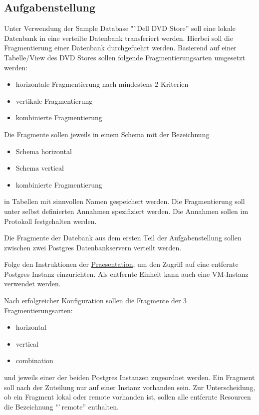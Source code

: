\subsection{Aufgabenstellung}
Unter Verwendung der Sample Database "`Dell DVD Store'' soll eine lokale Datenbank in eine verteilte Datenbank transferiert werden. Hierbei soll die Fragmentierung einer Datenbank durchgefuehrt werden. Basierend auf einer Tabelle/View des DVD Stores sollen folgende Fragmentierungsarten umgesetzt werden:
\begin{itemize}
	\item horizontale Fragmentierung nach mindestens 2 Kriterien
	\item vertikale Fragmentierung
	\item kombinierte Fragmentierung
\end{itemize}
Die Fragmente sollen jeweils in einem Schema mit der Bezeichnung
\begin{itemize}
	\item Schema horizontal
	\item Schema vertical
	\item kombinierte Fragmentierung
\end{itemize}
in Tabellen mit sinnvollen Namen gespeichert werden. Die Fragmentierung soll unter selbst definierten Annahmen spezifiziert werden. Die Annahmen sollen im Protokoll festgehalten werden.

Die Fragmente der Datebank aus dem ersten Teil der Aufgabenstellung sollen zwischen zwei Postgres Datenbankservern verteilt werden.

Folge den Instruktionen der \href{https://elearning.tgm.ac.at/archiv/draftfile.php/1564/user/draft/624435933/dezsy03_verteilte_db_postgres.pdf}{Praesentation}, um den Zugriff auf eine entfernte Postgres Instanz einzurichten. Als entfernte Einheit kann auch eine VM-Instanz verwendet werden.

Nach erfolgreicher Konfiguration sollen die Fragmente der 3 Fragmentierungsarten:
\begin{itemize}
	\item horizontal
	\item vertical
	\item combination
\end{itemize}
und jeweils einer der beiden Postgres Instanzen zugeordnet werden. Ein Fragment soll nach der Zuteilung nur auf einer Instanz vorhanden sein. Zur Unterscheidung, ob ein Fragment lokal oder remote vorhanden ist, sollen alle entfernte Resourcen die Bezeichnung "`remote'' enthalten.

